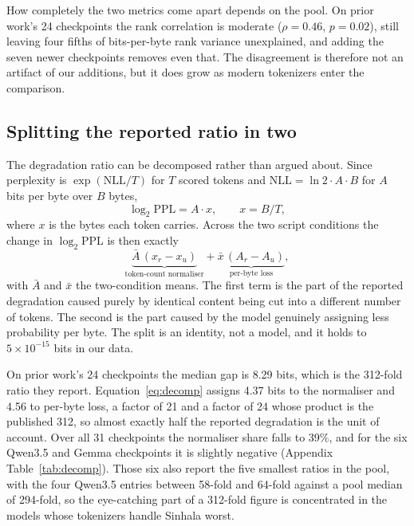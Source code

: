 \documentclass[11pt]{article}
\begin{document}
How completely the two metrics come apart depends on the pool. On prior work's 24
checkpoints the rank correlation is moderate ($\rho = 0.46$, $p = 0.02$), still
leaving four fifths of bits-per-byte rank variance unexplained, and adding the seven
newer checkpoints removes even that. The disagreement is therefore not an artifact
of our additions, but it does grow as modern tokenizers enter the comparison.

\subsection{Splitting the reported ratio in two}
\label{sec:decomp}

The degradation ratio can be decomposed rather than argued about. Since
perplexity is $\exp(\mathrm{NLL}/T)$ for $T$ scored tokens and
$\mathrm{NLL} = \ln 2 \cdot A \cdot B$ for $A$ bits per byte over $B$ bytes,
\begin{equation}
\log_2 \mathrm{PPL} = A \cdot x, \qquad x = B/T,
\label{eq:identity}
\end{equation}
where $x$ is the bytes each token carries. Across the two script conditions the
change in $\log_2 \mathrm{PPL}$ is then exactly
\begin{equation}
\underbrace{\bar{A}\,(x_r - x_u)}_{\text{token-count normaliser}}
+ \underbrace{\bar{x}\,(A_r - A_u)}_{\text{per-byte loss}},
\label{eq:decomp}
\end{equation}
with $\bar{A}$ and $\bar{x}$ the two-condition means. The first term is the part
of the reported degradation caused purely by identical content being cut into a
different number of tokens. The second is the part caused by the model genuinely
assigning less probability per byte. The split is an identity, not a model, and it
holds to $5 \times 10^{-15}$ bits in our data.

On prior work's 24 checkpoints the median gap is 8.29 bits, which is the 312-fold
ratio they report. Equation~\ref{eq:decomp} assigns 4.37 bits to the normaliser and
4.56 to per-byte loss, a factor of 21 and a factor of 24 whose product is the
published 312, so almost exactly half the reported degradation is the unit of
account. Over all 31 checkpoints the normaliser share falls to 39\%, and for the six Qwen3.5
and Gemma checkpoints it is slightly negative (Appendix Table~\ref{tab:decomp}).
Those six also report the five smallest ratios in the pool, with the four Qwen3.5
entries between 58-fold and 64-fold against a pool median of 294-fold, so the
eye-catching part of a 312-fold figure is concentrated in the models whose tokenizers
handle Sinhala worst.
\end{document}
